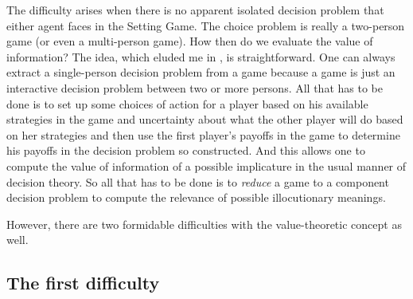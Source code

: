 The difficulty arises when there is no apparent isolated decision problem that either agent faces in the Setting Game. The choice problem is really a two-person game (or even a multi-person game). How then do we evaluate the value of information? The idea, which eluded me in \citet{parikh:rs, parikh:le}, is straightforward. One can always extract a single-person decision problem from a game because a game is just an interactive decision problem between two or more persons. All that has to be done is to set up some choices of action for a player based on his available strategies in the game and uncertainty about what the other player will do based on her strategies and then use the first player's payoffs in the game to determine his payoffs in the decision problem so constructed. And this allows one to compute the value of information of a possible implicature in the usual manner of decision theory. So all that has to be done is to \emph{reduce} a game to a component decision problem to compute the relevance of possible illocutionary meanings.

However, there are two formidable difficulties with the value-theoretic concept as well.

\subsection{The first difficulty}
%
%
%

